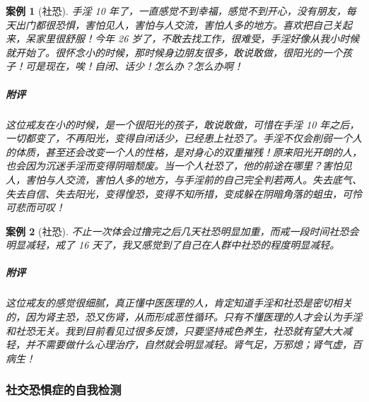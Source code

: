 \documentclass{ctexart}
\newtheorem{case}{案例}
\begin{document}
\begin{case}[社恐]
    手淫 10 年了，一直感觉不到幸福，感觉不到开心，没有朋友，每天出门都很恐惧，害怕见人，害怕与人交流，害怕人多的地方。喜欢把自己关起来，呆家里很舒服！今年 26 岁了，不敢去找工作，很难受，手淫好像从我小时候就开始了。很怀念小的时候，那时候身边朋友很多，敢说敢做，很阳光的一个孩子！可是现在，唉！自闭、话少！怎么办？怎么办啊！
    \subparagraph{附评} 这位戒友在小的时候，是一个很阳光的孩子，敢说敢做，可惜在手淫 10 年之后，一切都变了，不再阳光，变得自闭话少，已经患上社恐了。手淫不仅会削弱一个人的体质，甚至还会改变一个人的性格，是对身心的双重摧残！原来阳光开朗的人，也会因为沉迷手淫而变得阴暗颓废。当一个人社恐了，他的前途在哪里？害怕见人，害怕与人交流，害怕人多的地方，与手淫前的自己完全判若两人。失去底气、失去自信、失去阳光，变得惶恐，变得不知所措，变成躲在阴暗角落的蛆虫，可怜可悲而可叹！
\end{case}

\begin{case}[社恐]
    不止一次体会过撸完之后几天社恐明显加重，而戒一段时间社恐会明显减轻，戒了 16 天了，我又感觉到了自己在人群中社恐的程度明显减轻。
    \subparagraph{附评} 这位戒友的感觉很细腻，真正懂中医医理的人，肯定知道手淫和社恐是密切相关的，因为肾主恐，恐又伤肾，从而形成恶性循环。只有不懂医理的人才会认为手淫和社恐无关。我到目前看见过很多反馈，只要坚持戒色养生，社恐就有望大大减轻，并不需要做什么心理治疗，自然就会明显减轻。肾气足，万邪熄；肾气虚，百病生！
\end{case}

\subsubsection{社交恐惧症的自我检测}
\end{document}
